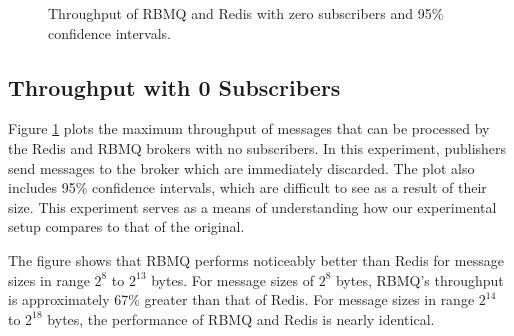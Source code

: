 \documentclass[letterpaper,twocolumn,10pt]{article}
\begin{document}
\begin{figure}[!t]
    \caption{Throughput of RBMQ and Redis with zero subscribers and 95\% confidence intervals.}
    \label{fig:0sub}
\end{figure}

\subsection{Throughput with 0 Subscribers}
Figure \ref{fig:0sub} plots the maximum throughput of messages that can be processed by the Redis and RBMQ brokers with no subscribers.
In this experiment, publishers send messages to the broker which are immediately discarded.
The plot also includes 95\% confidence intervals, which are difficult to see as a result of their size.
This experiment serves as a means of understanding how our experimental setup compares to that of the original.

The figure shows that RBMQ performs noticeably better than Redis for message sizes in range $2^{8}$ to $2^{13}$ bytes.
For message sizes of $2^8$ bytes, RBMQ's throughput is approximately 67\% greater than that of Redis.
For message sizes in range $2^{14}$ to $2^{18}$ bytes, the performance of RBMQ and Redis is nearly identical.
\end{document}
